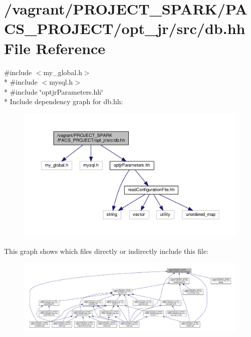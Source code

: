 \hypertarget{db_8hh}{\section{/vagrant/\-P\-R\-O\-J\-E\-C\-T\-\_\-\-S\-P\-A\-R\-K/\-P\-A\-C\-S\-\_\-\-P\-R\-O\-J\-E\-C\-T/opt\-\_\-jr/src/db.hh File Reference}
\label{db_8hh}
}
{\ttfamily \#include $<$my\-\_\-global.\-h$>$}\\*
{\ttfamily \#include $<$mysql.\-h$>$}\\*
{\ttfamily \#include \char`\"{}optjr\-Parameters.\-hh\char`\"{}}\\*
Include dependency graph for db.\-hh\-:\nopagebreak
\begin{figure}[H]
\begin{center}
\leavevmode
\includegraphics[width=350pt]{db_8hh__incl}
\end{center}
\end{figure}
This graph shows which files directly or indirectly include this file\-:\nopagebreak
\begin{figure}[H]
\begin{center}
\leavevmode
\includegraphics[width=350pt]{db_8hh__dep__incl}
\end{center}
\end{figure}
